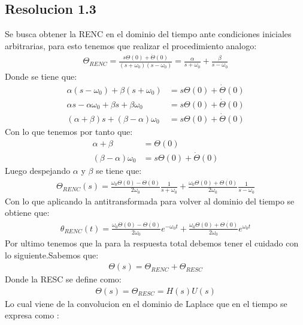 \documentclass[
  11pt,
  letterpaper,
   addpoints,
   answers
  ]{exam}
\begin{document}
\begin{questions}
\begin{solution}
    \subsection*{Resolucion 1.3}
    Se busca obtener la RENC en el dominio del tiempo ante condiciones iniciales arbitrarias, para esto tenemos que realizar el procedimiento analogo:
    \begin{align}
        \Theta_{RENC} = \frac{s\Theta(0) + \dot{\Theta}(0)}{(s+\omega_{0})(s-\omega_{0})} = \frac{\alpha}{s+\omega_{0}} + \frac{\beta}{s-\omega_{0}}
    \end{align}
    Donde se tiene que:
    \begin{align}
        \alpha(s-\omega_{0}) + \beta(s+\omega_{0}) &= s\Theta(0) + \dot{\Theta}(0)\\
        \alpha s - \alpha\omega_{0} + \beta s + \beta\omega_{0} &= s\Theta(0) + \dot{\Theta}(0)\\
        (\alpha + \beta)s + (\beta - \alpha)\omega_{0} &= s\Theta(0) + \dot{\Theta}(0)
    \end{align}
    Con lo que tenemos por tanto que:
    \begin{align}
        \alpha + \beta &= \Theta(0)\\
        (\beta - \alpha)\omega_{0} &=s\Theta(0) + \dot{\Theta}(0)   
    \end{align}
    Luego despejando $\alpha$ y $\beta$ se tiene que:
    \begin{align}
        \Theta_{RENC}(s) = \frac{\omega_{0}\Theta(0)- \dot{\Theta(0)}}{2\omega_{0}}\frac{1}{s+\omega_{0}} + \frac{\omega_{0}\Theta(0)+ \dot{\Theta(0)}}{2\omega_{0}}\frac{1}{s-\omega_{0}}
    \end{align}
    Con lo que aplicando la antitransformada para volver al dominio del tiempo se obtiene que:
    \begin{align}
        \theta_{RENC}(t) = \frac{\omega_{0}\Theta(0)- \dot{\Theta(0)}}{2\omega_{0}}e^{-\omega_{0}t} + \frac{\omega_{0}\Theta(0)+ \dot{\Theta(0)}}{2\omega_{0}}e^{\omega_{0}t}
    \end{align}
    Por ultimo tenemos que la para la respuesta total debemos tener el cuidado con lo siguiente.Sabemos que:
    \begin{align}
        \Theta(s) = \Theta_{RENC} + \Theta_{RESC}
    \end{align}
    Donde la RESC se define como:
    \begin{align}
        \Theta(s) = \Theta_{RESC} = H(s)U(s)
    \end{align}
    Lo cual viene de la convolucion en el dominio de Laplace que en el tiempo se expresa como :

\end{solution}
\end{questions}
\end{document}
